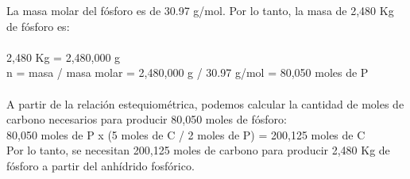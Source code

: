 \documentclass{article}
\begin{document}
La masa molar del fósforo es de 30.97 g/mol. Por lo tanto, la masa de 2,480 Kg de fósforo es:\\
\\
2,480 Kg = 2,480,000 g\\
n = masa / masa molar = 2,480,000 g / 30.97 g/mol = 80,050 moles de P\\
\\
A partir de la relación estequiométrica, podemos calcular la cantidad de moles de carbono necesarios para producir 80,050 moles de fósforo:\\
80,050 moles de P x (5 moles de C / 2 moles de P) = 200,125 moles de C\\
Por lo tanto, se necesitan 200,125 moles de carbono para producir 2,480 Kg de fósforo a partir del anhídrido fosfórico.\\
\end{document}
